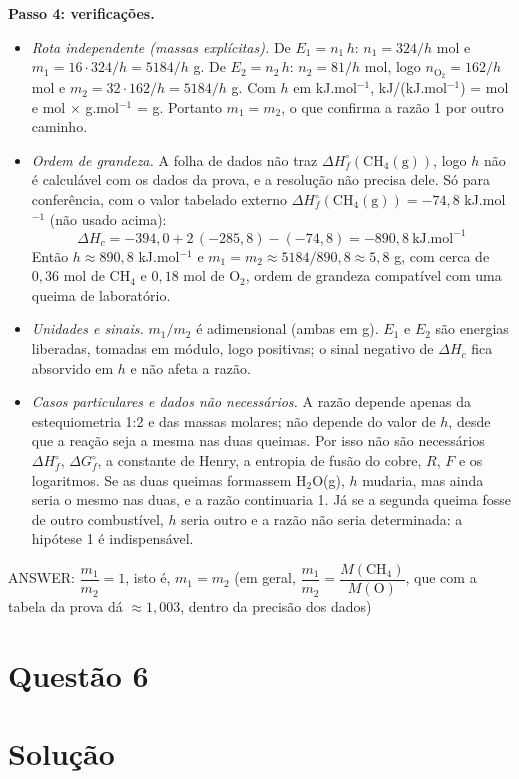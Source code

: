 \documentclass{article}%
\begin{document}
\textbf{Passo 4: verificações.}
\begin{itemize}
\item \textit{Rota independente (massas explícitas).} De $E_1=n_1\,h$: $n_1=324/h$ mol e $m_1=16\cdot 324/h=5184/h$ g. De $E_2=n_2\,h$: $n_2=81/h$ mol, logo $n_{\mathrm{O_2}}=162/h$ mol e $m_2=32\cdot 162/h=5184/h$ g. Com $h$ em kJ.mol$^{-1}$, kJ/(kJ.mol$^{-1}$) = mol e mol $\times$ g.mol$^{-1}$ = g. Portanto $m_1=m_2$, o que confirma a razão 1 por outro caminho.
\item \textit{Ordem de grandeza.} A folha de dados não traz $\Delta H^{\circ}_f(\mathrm{CH_4(g)})$, logo $h$ não é calculável com os dados da prova, e a resolução não precisa dele. Só para conferência, com o valor tabelado externo $\Delta H^{\circ}_f(\mathrm{CH_4(g)})=-74{,}8$ kJ.mol$^{-1}$ (não usado acima):
\[
\Delta H_c=-394{,}0+2\,(-285{,}8)-(-74{,}8)=-890{,}8\ \text{kJ.mol}^{-1}
\]
Então $h\approx 890{,}8$ kJ.mol$^{-1}$ e $m_1=m_2\approx 5184/890{,}8\approx 5{,}8$ g, com cerca de $0{,}36$ mol de CH$_4$ e $0{,}18$ mol de O$_2$, ordem de grandeza compatível com uma queima de laboratório.
\item \textit{Unidades e sinais.} $m_1/m_2$ é adimensional (ambas em g). $E_1$ e $E_2$ são energias liberadas, tomadas em módulo, logo positivas; o sinal negativo de $\Delta H_c$ fica absorvido em $h$ e não afeta a razão.
\item \textit{Casos particulares e dados não necessários.} A razão depende apenas da estequiometria 1:2 e das massas molares; não depende do valor de $h$, desde que a reação seja a mesma nas duas queimas. Por isso não são necessários $\Delta H^{\circ}_f$, $\Delta G^{\circ}_f$, a constante de Henry, a entropia de fusão do cobre, $R$, $F$ e os logaritmos. Se as duas queimas formassem H$_2$O(g), $h$ mudaria, mas ainda seria o mesmo nas duas, e a razão continuaria 1. Já se a segunda queima fosse de outro combustível, $h$ seria outro e a razão não seria determinada: a hipótese 1 é indispensável.
\end{itemize}

ANSWER: $\dfrac{m_1}{m_2}=1$, isto é, $m_1=m_2$ (em geral, $\dfrac{m_1}{m_2}=\dfrac{M(\mathrm{CH_4})}{M(\mathrm{O})}$, que com a tabela da prova dá $\approx 1{,}003$, dentro da precisão dos dados)%
\newpage%
\section*{Questão 6}

\section*{Solução}
\end{document}
